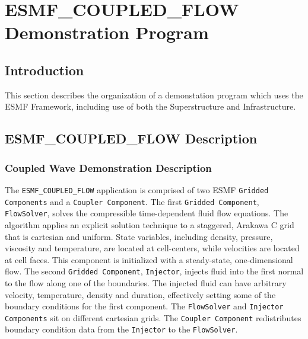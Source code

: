 
\section{ESMF\_COUPLED\_FLOW Demonstration Program}

\subsection{Introduction}

This section describes the organization of a
demonstation program which uses the ESMF Framework,
including use of both the 
Superstructure and Infrastructure.

\subsection{ESMF\_COUPLED\_FLOW Description}
 
\subsubsection{Coupled Wave Demonstration Description}

The {\tt ESMF\_COUPLED\_FLOW} application is comprised of two ESMF 
{\tt Gridded Components} and a {\tt Coupler Component}.  
The first {\tt Gridded Component}, {\tt FlowSolver}, solves the compressible 
time-dependent fluid flow equations.  The algorithm 
applies an explicit solution technique to a staggered, Arakawa C grid 
that is cartesian and uniform.  State variables, including density, 
pressure, viscosity and temperature, are located at cell-centers, while 
velocities are located at cell faces.  This component is initialized 
with a steady-state, one-dimensional flow.  The second {\tt Gridded 
Component}, {\tt Injector}, injects fluid into the first normal to the 
flow along 
one of the boundaries.  The injected fluid can have arbitrary velocity, 
temperature, density and duration, effectively setting some of 
the boundary conditions for the first component.  The {\tt FlowSolver} and 
{\tt Injector Components} sit on different cartesian grids.  The
{\tt Coupler Component} redistributes boundary condition data from 
the {\tt Injector} to the {\tt FlowSolver}.


